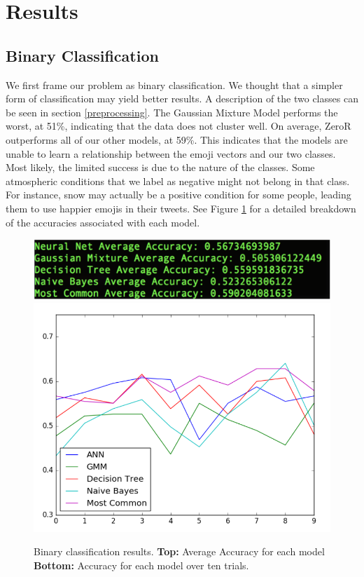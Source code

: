 \documentclass[12pt]{article}
\begin{document}
\section{Results}\label{results}

\subsection{Binary Classification}
We first frame our problem as binary classification. We thought that a simpler form of classification may yield better results. A description of the two classes can be seen in section \ref{preprocessing}. The Gaussian Mixture Model performs the worst, at 51\%, indicating that the data does not cluster well. On average, ZeroR outperforms all of our other models, at 59\%. This indicates that the models are unable to learn a relationship between the emoji vectors and our two classes. Most likely, the limited success is due to the nature of the classes. Some atmospheric conditions that we label as negative might not belong in that class. For instance, snow may actually be a positive condition for some people, leading them to use happier emojis in their tweets. See Figure \ref{fig:binary} for a detailed breakdown of the accuracies associated with each model.

\begin{figure}[H]
\includegraphics[scale=0.6]{binaryavg}
\includegraphics[scale=0.7]{binarygraph}
\centering
\caption{Binary classification results. \textbf{Top:} Average Accuracy for each model \textbf{Bottom:} Accuracy for each model over ten trials.}
\label{fig:binary}
\end{figure}
\end{document}
